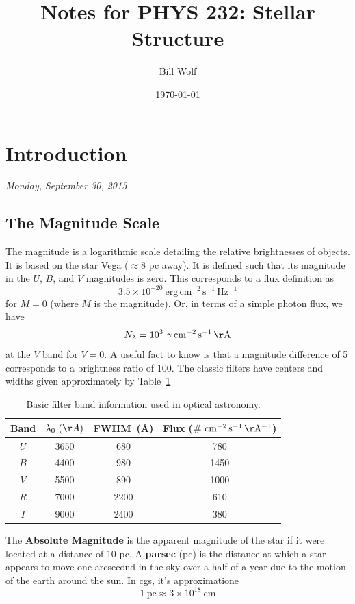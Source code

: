 \documentclass[10pt]{article}
\title{Notes for PHYS 232: Stellar Structure}
\author{Bill Wolf}
\date{\today}
\numberwithin{equation}{section}
\newcommand{\n}{\noindent}
\begin{document}
\vfill\maketitle\vfill \newpage

\tableofcontents \newpage

\section{Introduction}
\emph{Monday, September 30, 2013}
\subsection{The Magnitude Scale} %
	\label{sub:the_magnitude_scale}
	The magnitude is a logarithmic scale detailing the relative brightnesses of
objects. It is based on the star Vega ($\approx 8$ pc away). It is defined such
that its magnitude in the $U$, $B$, and $V$ magnitudes is zero. This
corresponds to a flux definition as
	\begin{equation}
		\label{mag:1} 3.5\times 10^{-20}\ \mathrm{erg\,cm^{-2}\,s^{-1}\,Hz^{-1}}
	\end{equation}
	for $M = 0$ (where $M$ is the magnitude). Or, in terms of a simple photon
flux, we have
	\begin{equation}
		\label{mag:2} N_\lambda = 10^3\ \mathrm{\gamma\,cm^{-2}\,s^{-1}\,\AA}
	\end{equation}
	at the $V$ band for $V=0$. A useful fact to know is that a magnitude
difference of 5 corresponds to a brightness ratio of 100. The classic filters
have centers and widths given approximately by Table~\ref{tab:mag:1}
	\begin{table}[b]
		\centering
		\begin{tabular}{cccc}
		Band & $\lambda_0\ (\AA)$ & FWHM\ (\AA) & Flux ($\mathrm{\#\
		 cm^{-2}\,s^{-1}\,\AA^{-1}}$)\\
		 \hline
		 $U$ & 3650 & 680 & 780 \\
		 $B$ & 4400 & 980 & 1450 \\
		 $V$ & 5500 & 890 & 1000 \\
		 $R$ & 7000 & 2200 & 610 \\
		 $I$ & 9000 & 2400 & 380
		\end{tabular}
		\caption{Basic filter band information used in optical astronomy.}
		\label{tab:mag:1}
	\end{table}
	
	\n The \textbf{Absolute Magnitude} is the apparent magnitude of the star if
it were located at a distance of 10 pc. A \textbf{parsec} (pc) is the distance
at which a star appears to move one arcsecond in the sky over a half of a year
due to the motion of the earth around the sun. In cgs, it's approximatione
	\begin{equation}
		\label{eq:pc:1} 1\ \mathrm{pc} \approx 3\times 10^{18}\ \mathrm{cm}
	\end{equation}
	
\end{document}

